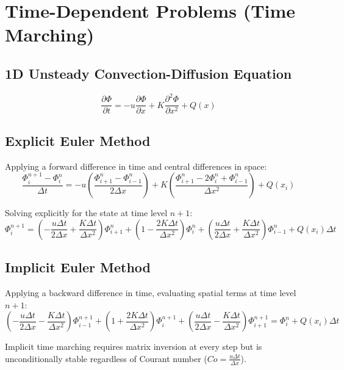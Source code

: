 \documentclass{article}
\begin{document}
\section{Time-Dependent Problems (Time Marching)}

\subsection{1D Unsteady Convection-Diffusion Equation}

\begin{equation}
    \frac{\partial\Phi}{\partial t} = -u \frac{\partial\Phi}{\partial x} + K \frac{\partial^2\Phi}{\partial x^2} + Q(x)
\end{equation}

\subsection{Explicit Euler Method}

Applying a forward difference in time and central differences in space:
\begin{equation}
    \frac{\Phi_i^{n+1} - \Phi_i^n}{\Delta t} = -u \left(\frac{\Phi_{i+1}^n - \Phi_{i-1}^n}{2\Delta x}\right) + K \left(\frac{\Phi_{i+1}^n - 2\Phi_i^n + \Phi_{i-1}^n}{\Delta x^2}\right) + Q(x_i)
\end{equation}

Solving explicitly for the state at time level $n+1$:
\begin{equation}
    \Phi_i^{n+1} = \left(-\frac{u\Delta t}{2\Delta x} + \frac{K\Delta t}{\Delta x^2}\right) \Phi_{i+1}^n + \left(1 - \frac{2K\Delta t}{\Delta x^2}\right) \Phi_i^n + \left(\frac{u\Delta t}{2\Delta x} + \frac{K\Delta t}{\Delta x^2}\right) \Phi_{i-1}^n + Q(x_i)\Delta t
\end{equation}

\subsection{Implicit Euler Method}

Applying a backward difference in time, evaluating spatial terms at time level $n+1$:
\begin{equation}
    \left(-\frac{u\Delta t}{2\Delta x} - \frac{K\Delta t}{\Delta x^2}\right) \Phi_{i-1}^{n+1} + \left(1 + \frac{2K\Delta t}{\Delta x^2}\right) \Phi_i^{n+1} + \left(\frac{u\Delta t}{2\Delta x} - \frac{K\Delta t}{\Delta x^2}\right) \Phi_{i+1}^{n+1} = \Phi_i^n + Q(x_i)\Delta t
\end{equation}

Implicit time marching requires matrix inversion at every step but is unconditionally stable regardless of Courant number ($Co = \frac{u \Delta t}{\Delta x}$).
\end{document}
